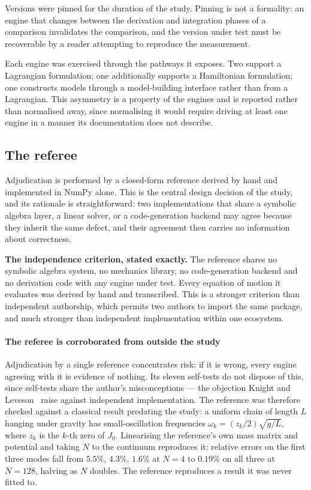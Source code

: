 \documentclass[review,12pt]{elsarticle}
\begin{document}
Versions were pinned for the duration of the study. Pinning is not a formality:
an engine that changes between the derivation and integration phases of a
comparison invalidates the comparison, and the version under test must be
recoverable by a reader attempting to reproduce the measurement.

Each engine was exercised through the pathways it exposes. Two support a
Lagrangian formulation; one additionally supports a Hamiltonian formulation; one
constructs models through a model-building interface rather than from a
Lagrangian. This asymmetry is a property of the engines and is reported rather
than normalised away, since normalising it would require driving at least one
engine in a manner its documentation does not describe.

\subsection{The referee}\label{sec:reference}
Adjudication is performed by a closed-form reference derived by hand and
implemented in NumPy alone. This is the central design decision of the study,
and its rationale is straightforward: two implementations that share a symbolic
algebra layer, a linear solver, or a code-generation backend may agree because
they inherit the same defect, and their agreement then carries no information
about correctness.

\textbf{The independence criterion, stated exactly.} The reference shares no
symbolic algebra system, no mechanics library, no code-generation backend and no
derivation code with any engine under test. Every equation of motion it evaluates
was derived by hand and transcribed. This is a stronger criterion than
independent authorship, which permits two authors to import the same package,
and much stronger than independent implementation within one ecosystem.

\paragraph{The referee is corroborated from outside the study}
Adjudication by a single reference concentrates risk: if it is wrong, every
engine agreeing with it is evidence of nothing. Its eleven self-tests do not
dispose of this, since self-tests share the author's misconceptions --- the
objection Knight and Leveson~\cite{knight1986} raise against independent
implementation. The reference was therefore checked against a classical result
predating the study: a uniform chain of length $L$ hanging under gravity has
small-oscillation frequencies $\omega_k = (z_k/2)\sqrt{g/L}$, where $z_k$ is the
$k$-th zero of $J_0$. Linearising the reference's own mass matrix and potential
and taking $N$ to the continuum reproduces it: relative errors on the first
three modes fall from $5.5\%$, $4.3\%$, $1.6\%$ at $N=4$ to $0.19\%$ on all three at
$N=128$, halving as $N$ doubles. The reference reproduces a result it was never
fitted to.
\end{document}
